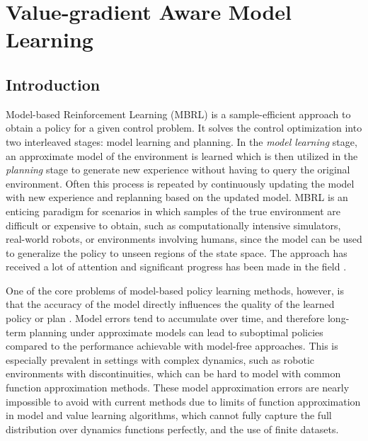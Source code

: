 \chapter{Value-gradient Aware Model Learning}
\label{chap:vagram}

\newcommand{\revised}[1]{#1}
\section{Introduction}
Model-based Reinforcement Learning (MBRL) is a sample-efficient approach to obtain a policy for a given control problem. It solves the control optimization into two interleaved stages: model learning and planning. In the \emph{model learning} stage, an approximate model of the environment is learned which is then utilized in the \emph{planning} stage to generate new experience without having to query the original environment. Often this process is repeated by continuously updating the model with new experience and replanning based on the updated model. MBRL  is an enticing paradigm for scenarios in which samples of the true environment are difficult or expensive to obtain, such as computationally intensive simulators, real-world robots, or environments involving humans, since the model can be used to generalize the policy to unseen regions of the state space. The approach has received a lot of attention and significant progress has been made in the field \parencite{dyna,deisenroth2011pilco,levine2013guided,Hafner2020Dream,moerland,schrittwieser2020mastering}.

One of the core problems of model-based policy learning methods, however, is that the accuracy of the model directly influences the quality of the learned policy or plan \parencite{schneider1997exploiting,kearns2002near,ross2012agnostic,talvitie2017self,luo2018algorithmic,mbpo}. 
Model errors tend to accumulate over time, and therefore long-term planning under approximate models can lead to suboptimal policies compared to the performance achievable with model-free approaches.
This is especially prevalent in settings with complex dynamics, such as robotic environments with discontinuities, which can be hard to model with common function approximation methods.
These model approximation errors are nearly impossible to avoid with current methods due to limits of function approximation in model and value learning algorithms, which cannot fully capture the full distribution over dynamics functions perfectly, and the use of finite datasets.

